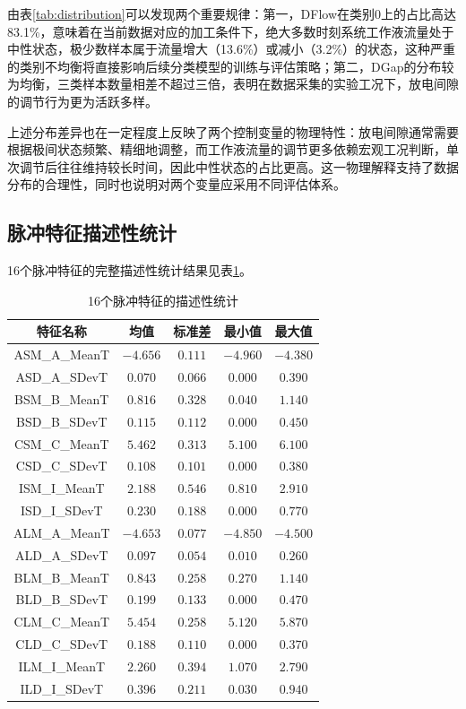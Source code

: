 \documentclass[UTF8,a4paper,12pt]{ctexart}
\begin{document}
由表\ref{tab:distribution}可以发现两个重要规律：第一，DFlow在类别$0$上的占比高达83.1\%，意味着在当前数据对应的加工条件下，绝大多数时刻系统工作液流量处于中性状态，极少数样本属于流量增大（13.6\%）或减小（3.2\%）的状态，这种严重的类别不均衡将直接影响后续分类模型的训练与评估策略；第二，DGap的分布较为均衡，三类样本数量相差不超过三倍，表明在数据采集的实验工况下，放电间隙的调节行为更为活跃多样。

上述分布差异也在一定程度上反映了两个控制变量的物理特性：放电间隙通常需要根据极间状态频繁、精细地调整，而工作液流量的调节更多依赖宏观工况判断，单次调节后往往维持较长时间，因此中性状态的占比更高。这一物理解释支持了数据分布的合理性，同时也说明对两个变量应采用不同评估体系。

\subsection{脉冲特征描述性统计}

16个脉冲特征的完整描述性统计结果见表\ref{tab:descriptive}。

\begin{table}[H]
\centering
\caption{16个脉冲特征的描述性统计}
\label{tab:descriptive}
\begin{tabular}{ccccc}
\toprule
特征名称 & 均值 & 标准差 & 最小值 & 最大值 \\
\midrule
ASM\_A\_MeanT & $-4.656$ & $0.111$ & $-4.960$ & $-4.380$ \\
ASD\_A\_SDevT & $0.070$ & $0.066$ & $0.000$ & $0.390$ \\
BSM\_B\_MeanT & $0.816$ & $0.328$ & $0.040$ & $1.140$ \\
BSD\_B\_SDevT & $0.115$ & $0.112$ & $0.000$ & $0.450$ \\
CSM\_C\_MeanT & $5.462$ & $0.313$ & $5.100$ & $6.100$ \\
CSD\_C\_SDevT & $0.108$ & $0.101$ & $0.000$ & $0.380$ \\
ISM\_I\_MeanT & $2.188$ & $0.546$ & $0.810$ & $2.910$ \\
ISD\_I\_SDevT & $0.230$ & $0.188$ & $0.000$ & $0.770$ \\
ALM\_A\_MeanT & $-4.653$ & $0.077$ & $-4.850$ & $-4.500$ \\
ALD\_A\_SDevT & $0.097$ & $0.054$ & $0.010$ & $0.260$ \\
BLM\_B\_MeanT & $0.843$ & $0.258$ & $0.270$ & $1.140$ \\
BLD\_B\_SDevT & $0.199$ & $0.133$ & $0.000$ & $0.470$ \\
CLM\_C\_MeanT & $5.454$ & $0.258$ & $5.120$ & $5.870$ \\
CLD\_C\_SDevT & $0.188$ & $0.110$ & $0.000$ & $0.370$ \\
ILM\_I\_MeanT & $2.260$ & $0.394$ & $1.070$ & $2.790$ \\
ILD\_I\_SDevT & $0.396$ & $0.211$ & $0.030$ & $0.940$ \\
\bottomrule
\end{tabular}
\end{table}
\end{document}
